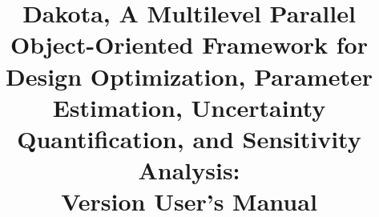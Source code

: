 \documentclass[ps2pdf,11pt,report,strict]{SANDreport}
\title{Dakota, A Multilevel Parallel Object-Oriented Framework for 
Design Optimization, Parameter Estimation, Uncertainty Quantification, 
and Sensitivity Analysis:\\Version \DakotaVersion\space User's Manual}
\author{\DakotaAuthorLong}
\begin{document}
\maketitle
\begin{abstract}
\DakotaAbstractShared
\DakotaAbstractUsers
\end{abstract}


\SANDmain 






\begin{SANDdistribution}[NM]





\end{SANDdistribution}

\end{document}
